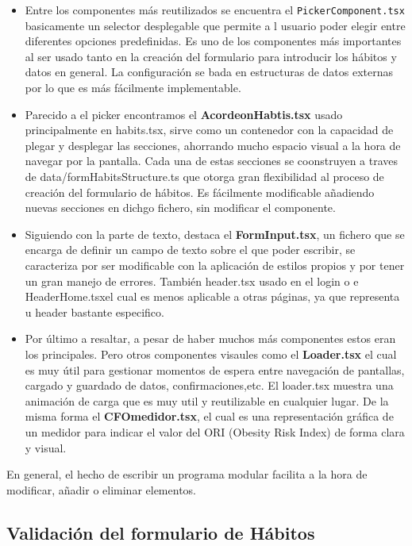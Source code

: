 \begin{itemize}
     \item Entre los componentes más reutilizados se encuentra el \texttt{PickerComponent.tsx} basicamente un selector desplegable que permite a l usuario poder elegir entre diferentes opciones predefinidas. Es uno de los componentes más importantes al ser usado tanto en la creación del formulario para introducir los hábitos y datos en general. La configuración se bada en estructuras de datos externas por lo que es más fácilmente implementable. 

    \item Parecido a el picker encontramos el \textbf{AcordeonHabtis.tsx} usado principalmente en habits.tsx, sirve como un contenedor con la capacidad de plegar y desplegar las secciones, ahorrando mucho espacio visual a la hora de navegar por la pantalla. 
    Cada una de estas secciones se coonstruyen a traves de data/formHabitsStructure.ts que otorga gran flexibilidad al proceso de creación del formulario de hábitos. Es fácilmente modificable añadiendo nuevas secciones en dichgo fichero, sin modificar el componente.

    \item Siguiendo con la parte de texto, destaca el \textbf{FormInput.tsx}, un fichero que se encarga de definir un campo de texto sobre el que poder escribir, se caracteriza por ser modificable con la aplicación de estilos propios y por tener un gran manejo de errores. También header.tsx usado en el login o e HeaderHome.tsxel cual es menos aplicable a otras páginas, ya que representa u header bastante especifico.

    \item Por último a resaltar, a pesar de haber muchos más componentes estos eran los principales. Pero otros componentes visaules como el \textbf{Loader.tsx} el cual es muy útil para gestionar momentos de espera entre navegación de pantallas, cargado y guardado de datos, confirmaciones,etc. El loader.tsx muestra una animación de carga que es muy util y reutilizable en cualquier lugar. De la misma forma el \textbf{CFOmedidor.tsx}, el cual es una representación gráfica de un medidor para indicar el valor del ORI (Obesity Risk Index) de forma clara y visual.
\end{itemize}

En general, el hecho de escribir un programa modular facilita a la hora de modificar, añadir o eliminar elementos.

\subsection{Validación del formulario de Hábitos}


